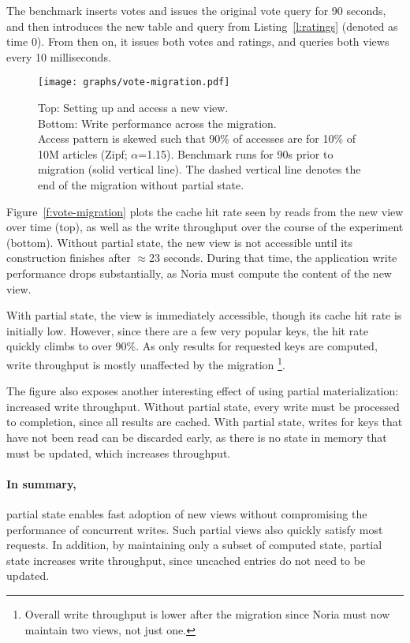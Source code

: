 The benchmark inserts votes and issues the original vote query for 90 seconds,
and then introduces the new table and query from Listing~\ref{l:ratings}
(denoted as time 0). From then on, it issues both votes and ratings, and queries
both views every 10 milliseconds.

\begin{figure}[h]
  \centering
  \texttt{[image: graphs/vote-migration.pdf]}
  \caption{Top: Setting up and access a new view.\\ Bottom: Write performance
  across the migration.\\ Access pattern is skewed such that 90\% of accesses are for
  10\% of 10M articles (Zipf; $\alpha$=1.15). Benchmark runs for 90s prior to
  migration (solid vertical line). The dashed vertical line denotes the end of
  the migration without partial state.}
  \label{f:vote-migration}
\end{figure}

Figure~\vref{f:vote-migration} plots the cache hit rate seen by reads from the
new view over time (top), as well as the write throughput over the course of the
experiment (bottom). Without partial state, the new view is not accessible until
its construction finishes after $\approx$23 seconds. During that time, the
application write performance drops substantially, as Noria must compute the
content of the new view.

With partial state, the view is immediately accessible, though its cache hit
rate is initially low. However, since there are a few very popular keys, the hit
rate quickly climbs to over 90\%. As only results for requested keys are
computed, write throughput is mostly unaffected by the migration%
\footnote{Overall write throughput is lower after the migration since Noria must
now maintain two views, not just one.}.

The figure also exposes another interesting effect of using partial
materialization: increased write throughput. Without partial state, every write
must be processed to completion, since all results are cached. With partial
state, writes for keys that have not been read can be discarded early, as there
is no state in memory that must be updated, which increases throughput.

\paragraph{In summary,} partial state enables fast adoption of new views without
compromising the performance of concurrent writes. Such partial views also
quickly satisfy most requests. In addition, by maintaining only a subset of
computed state, partial state increases write throughput, since uncached entries
do not need to be updated.

